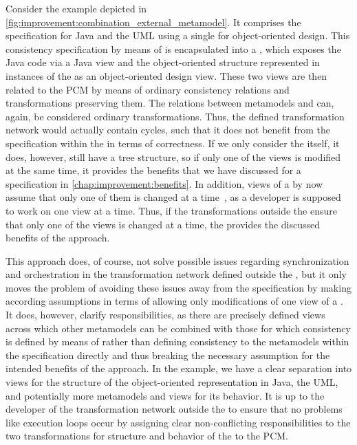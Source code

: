 Consider the example depicted in \autoref{fig:improvement:combination_external_metamodel}.
It comprises the \commonalities specification for Java and the \gls{UML} using a single \conceptmetamodel for object-oriented design.
This consistency specification by means of \commonalities is encapsulated into a \vsum, which exposes the Java code via a Java view and the object-oriented structure represented in instances of the \conceptmetamodel as an object-oriented design view.
These two views are then related to the \gls{PCM} by means of ordinary consistency relations and transformations preserving them.
The relations between metamodels and \viewtypes can, again, be considered ordinary transformations.
Thus, the defined transformation network would actually contain cycles, such that it does not benefit from the \commonalities specification within the \vsum in terms of correctness.
If we only consider the \vsum itself, it does, however, still have a tree structure, so if only one of the views is modified at the same time, it provides the benefits that we have discussed for a \commonalities specification in \autoref{chap:improvement:benefits}.
In addition, views of a \vsum by now assume that only one of them is changed at a time~, as a developer is supposed to work on one view at a time.
Thus, if the transformations outside the \vsum ensure that only one of the views is changed at a time, the \vsum provides the discussed benefits of the \commonalities approach.

This approach does, of course, not solve possible issues regarding synchronization and orchestration in the transformation network defined outside the \vsum, but it only moves the problem of avoiding these issues away from the \commonalities specification by making according assumptions in terms of allowing only modifications of one view of a \vsum.
It does, however, clarify responsibilities, as there are precisely defined views across which other metamodels can be combined with those for which consistency is defined by means of \commonalities rather than defining consistency to the metamodels within the \commonalities specification directly and thus breaking the necessary assumption for the intended benefits of the approach.
In the example, we have a clear separation into views for the structure of the object-oriented representation in Java, the \gls{UML}, and potentially more metamodels and views for its behavior.
It is up to the developer of the transformation network outside the \vsum to ensure that no problems like execution loops occur by assigning clear non-conflicting responsibilities to the two transformations for structure and behavior of the \vsum to the \gls{PCM}.

